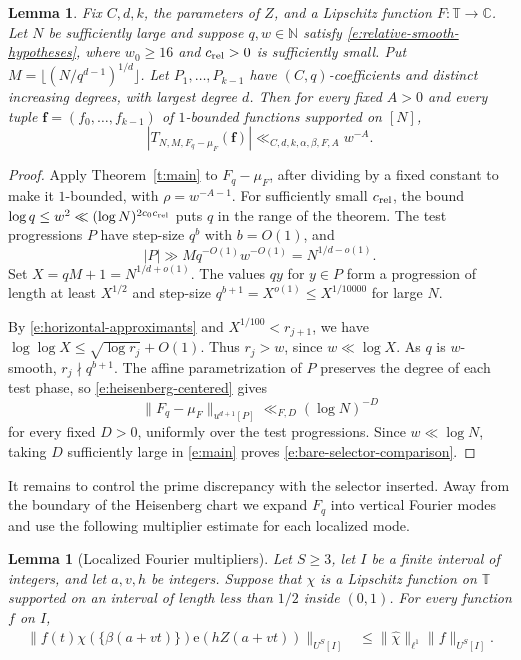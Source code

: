 \documentclass[12pt]{amsart}
\newcommand{\1}{\mathbf 1}
\newcommand{\e}{\mathrm e}
\newtheorem{lemma}[theorem]{Lemma}
\theoremstyle{definition}
\begin{document}
\begin{lemma}\label{l:unweighted-selector-relative-range}
Fix \(C,d,k\), the parameters of \(Z\), and a Lipschitz function
\(F:\mathbb T\to\mathbb C\). Let \(N\) be sufficiently large and
suppose \(q,w\in\mathbb N\) satisfy \eqref{e:relative-smooth-hypotheses},
where \(w_0\ge16\) and \(c_{\rm rel}>0\) is sufficiently small.
Put \(M=\lfloor(N/q^{d-1})^{1/d}\rfloor\). Let
\(P_1,\ldots,P_{k-1}\) have \((C,q)\)-coefficients and distinct
increasing degrees, with largest degree \(d\). Then for every
fixed \(A>0\) and every tuple \(\mathbf f=(f_0,\ldots,f_{k-1})\)
of \(1\)-bounded functions supported on \([N]\),
\begin{equation}\label{e:bare-selector-comparison}
 |T_{N,M,F_q-\mu_F}(\mathbf f)|\ll_{C,d,k,\alpha,\beta,F,A}w^{-A}.
\end{equation}
\end{lemma}

\begin{proof}
Apply Theorem~\ref{t:main} to \(F_q-\mu_F\), after dividing by a
fixed constant to make it \(1\)-bounded, with \(\rho=w^{-A-1}\).
For sufficiently small \(c_{\rm rel}\), the bound
\(\log q\le w^2\ll(\log N)^{2c_0c_{\rm rel}}\) puts \(q\) in the
range of the theorem. The test progressions \(P\) have step-size \(q^b\)
with \(b=O(1)\), and
\[
 |P|\gg Mq^{-O(1)}w^{-O(1)}=N^{1/d-o(1)}.
\]
Set \(X=qM+1=N^{1/d+o(1)}\). The values \(qy\) for \(y\in P\)
form a progression of length at least \(X^{1/2}\) and step-size
\(q^{b+1}=X^{o(1)}\le X^{1/10000}\) for large \(N\).

By \eqref{e:horizontal-approximants} and \(X^{1/100}<r_{j+1}\),
we have \(\log\log X\le\sqrt{\log r_j}+O(1)\). Thus \(r_j>w\),
since \(w\ll\log X\). As \(q\) is \(w\)-smooth, \(r_j\nmid q^{b+1}\).
The affine parametrization of \(P\) preserves the degree of each
test phase, so \eqref{e:heisenberg-centered} gives
\[
 \|F_q-\mu_F\|_{u^{d+1}[P]}\ll_{F,D}(\log N)^{-D}
\]
for every fixed \(D>0\), uniformly over the test progressions.
Since \(w\ll\log N\), taking \(D\) sufficiently large in
\eqref{e:main} proves \eqref{e:bare-selector-comparison}.
\end{proof}

It remains to control the prime discrepancy with the selector
inserted. Away from the boundary of the Heisenberg chart we
expand \(F_q\) into vertical Fourier modes and use the following
multiplier estimate for each localized mode.

\begin{lemma}[Localized Fourier multipliers]\label{l:vertical-mode-multiplier}
Let \(S\geq3\), let \(I\) be a finite interval of integers, and let
\(a,v,h\) be integers. Suppose that \(\chi\) is a Lipschitz function
on \(\mathbb T\) supported on an interval of length less than \(1/2\)
inside \((0,1)\). For every function \(f\) on \(I\),
\begin{align}
 \|f(t)\chi(\{\beta(a+vt)\})\e(hZ(a+vt))\|_{U^S[I]}
 &\leq\|\widehat\chi\|_{\ell^1}\|f\|_{U^S[I]}.
 \label{e:vertical-mode-multiplier}
\end{align}
\end{lemma}
\end{document}
